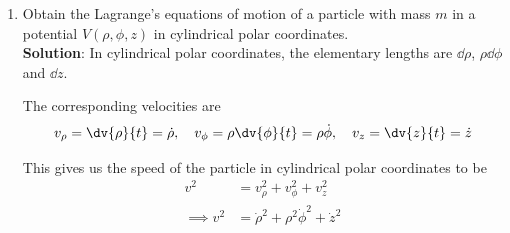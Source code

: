 \begin{enumerate}
\begin{itemize}
		\item $\phi$-coordinate:\\
		The Lagrange's equation (\ref{eqn:eg-1:lagrange-eqn}) for $q_3=\phi$ is
		\begin{align}
			\dv{t}\pdv{\lagrangian}{\dot{q}_3}-\pdv{\lagrangian}{q_3}&=0 \nonumber\\
			\implies\dv{t}\pdv{\lagrangian}{\dot{\phi}}-\pdv{\lagrangian}{\phi}&=0 \label{eqn:lag-phi-coord}
		\end{align}
		
		From equation (\ref{eqn:lag-spc}), we have
		\begin{align*}
			\pdv{\lagrangian}{\dot{\phi}}&=2\times\dfrac{1}{2}mr^2\sin^2{\theta}\dot{\phi}=mr^2\sin^2{\theta}\dot{\phi} \\
			\implies\dv{t}\pdv{\lagrangian}{\dot{\phi}}&=\dv{t}\qty(mr^2\sin^2{\theta}\dot{\phi})=mr^2\sin^2{\theta}\ddot{\phi}+2mr^2\sin{\theta}\cos{\theta}\dot{\theta}\dot{\phi}+2mr\sin^2{\theta}\dot{r}\dot{\phi}
		\end{align*}
		and also
		\begin{align*}
			\pdv{\lagrangian}{\phi}&=-\pdv{V}{\phi}
		\end{align*}
		
		Therefore, in equation (\ref{eqn:lag-phi-coord}), we obtain
		\begin{align*}
			\Aboxed{mr^2\sin^2{\theta}\ddot{\phi}+2mr^2\sin{\theta}\cos{\theta}\dot{\theta}\dot{\phi}+2mr\sin^2{\theta}\dot{r}\dot{\phi}+\pdv{V}{\phi}&=0}
		\end{align*}
	\end{itemize}
	
	\item Obtain the Lagrange's equations of motion of a particle with mass $m$ in a potential $V(\rho,\phi,z)$ in cylindrical polar coordinates.\\ \setcounter{equation}{0}
	\textbf{Solution}: In cylindrical polar coordinates, the elementary lengths are $\dd{\rho}$, $\rho\dd{\phi}$ and $\dd{z}$.
	
	The corresponding velocities are
	\begin{align*}
		v_\rho=\dv{\rho}{t}=\dot{\rho},\quad v_\phi=\rho\dv{\phi}{t}=\rho\dot{\phi},\quad v_z=\dv{z}{t}=\dot{z}
	\end{align*}
	
	This gives us the speed of the particle in cylindrical polar coordinates to be
	\begin{align*}
		v^2&=v_\rho^2+v_\phi^2+v_z^2 \\
		\implies v^2&=\dot{\rho}^2+\rho^2\dot{\phi}^2+\dot{z}^2
	\end{align*}
	

\end{enumerate}
